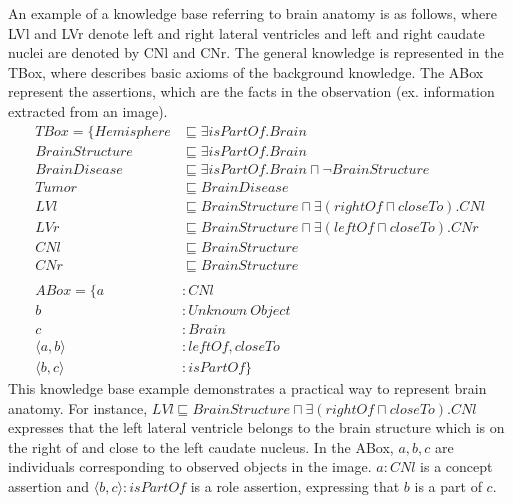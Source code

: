 \documentclass{article}
\begin{document}
An example of a knowledge base referring to brain anatomy is as follows, where LVl and LVr denote left and right lateral ventricles and left and right caudate nuclei are denoted by CNl and CNr.
The general knowledge is represented in the TBox, where describes basic axioms of the background knowledge. The ABox represent the assertions, which are the facts in the observation (ex. information
extracted from an image).
\begin{align*}
 TBox=\{ Hemisphere &\sqsubseteq \exists isPartOf. Brain\\
	 BrainStructure &\sqsubseteq \exists isPartOf. Brain\\
	 BrainDisease &\sqsubseteq \exists isPartOf. Brain \sqcap \neg BrainStructure\\
	 Tumor  &\sqsubseteq BrainDisease\\
	 LVl &\sqsubseteq BrainStructure \sqcap \exists (rightOf \sqcap closeTo). CNl\\
	 LVr &\sqsubseteq BrainStructure \sqcap \exists (leftOf \sqcap closeTo). CNr\\
	 CNl &\sqsubseteq BrainStructure\\
	 CNr &\sqsubseteq BrainStructure\\
\\
 ABox=\{ a&: CNl \\
	 b&: Unknown~Object\\
	 c&: Brain \\
	 \langle a,b\rangle &: leftOf, closeTo \\
	 \langle b,c\rangle &: isPartOf\}
\end{align*}
This knowledge base  example demonstrates a practical way to represent brain anatomy. 
For instance, $LVl \sqsubseteq BrainStructure \sqcap \exists (rightOf \sqcap closeTo). CNl$ expresses that
the left lateral ventricle belongs to the brain structure which is on the right of and close to the left caudate nucleus.
In the ABox, $a,b,c$ are individuals corresponding to observed objects in the image. $a: CNl$ is a concept assertion and 
$\langle b,c\rangle : isPartOf$ is a role assertion, expressing that $b$ is a part of $c$.
\end{document}
